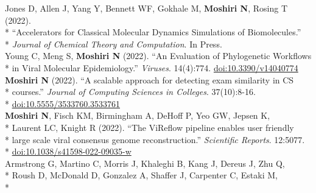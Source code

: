 \documentclass[margin,line]{res}
\begin{document}
\begin{resume}
\hspace*{4mm} Jones D, Allen J, Yang Y, Bennett WF, Gokhale M, \textbf{Moshiri N}, Rosing T (2022).\\*
\hspace*{9mm} ``Accelerators for Classical Molecular Dynamics Simulations of Biomolecules.''\\*\vspace{2mm}
\hspace*{8mm} \textit{Journal of Chemical Theory and Computation}. In Press.\\
\hspace*{4mm} Young C, Meng S, \textbf{Moshiri N} (2022). ``An Evaluation of Phylogenetic Workflows\\*\vspace{2mm}
\hspace*{8mm} in Viral Molecular Epidemiology.'' \textit{Viruses}. 14(4):774. \href{https://doi.org/10.3390/v14040774}{doi:10.3390/v14040774}\\
\hspace*{4mm} \textbf{Moshiri N} (2022). ``A scalable approach for detecting exam similarity in CS\\*
\hspace*{9mm} courses.'' \textit{Journal of Computing Sciences in Colleges}. 37(10):8-16.\\*\vspace{2mm}
\hspace*{8mm} \href{https://doi.org/10.5555/3533760.3533761}{doi:10.5555/3533760.3533761}\\
\hspace*{4mm} \textbf{Moshiri N}, Fisch KM, Birmingham A, DeHoff P, Yeo GW, Jepsen K,\\*
\hspace*{9mm} Laurent LC, Knight R (2022). ``The ViReflow pipeline enables user friendly\\*
\hspace*{9mm} large scale viral consensus genome reconstruction.'' \textit{Scientific Reports}. 12:5077.\\*\vspace{2mm}
\hspace*{8mm} \href{https://doi.org/10.1038/s41598-022-09035-w}{doi:10.1038/s41598-022-09035-w}\\
\hspace*{4mm} Armstrong G, Martino C, Morris J, Khaleghi B, Kang J, Dereus J, Zhu Q,\\*
\hspace*{9mm} Roush D, McDonald D, Gonzalez A, Shaffer J, Carpenter C, Estaki M,\\*

\end{resume}
\end{document}
